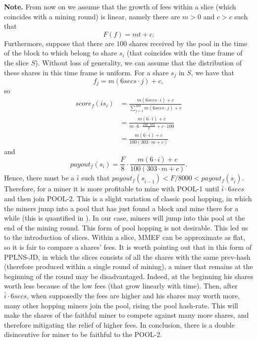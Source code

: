 \documentclass[10pt]{article}
\begin{document}
\textbf{Note.} From now on we assume that the growth of fees within a slice (which coincides with a mining round) is linear, namely there are $m>0$ and $c>c$ such that 
\[F(f) = mt+c.\]
Furthermore, suppose that there are $100$ shares received by the pool in the time of the block to which belong to share $s_i$ (that coincides with the time frame of the slice $S$). Without loss of generality, we can assume that the distribution of these shares in this time frame is uniform. For a share $s_j$ in $S$, we have that 
\[ f_j = m(6secs \cdot j) +c,\]
so
\begin{align*}
	score_f(is_i) &= \frac{m(6secs\cdot i) +c}{\sum_{j=1}^{100} m(6secs\cdot j) +c}\\
	&= \frac{m(6\cdot i) +c}{m\cdot 6\cdot\frac{100\cdot101}{2} +c\cdot 100}\\
	&= \frac{m(6\cdot i) +c}{100(303\cdot m +c)}
\end{align*}
and 
\[payout_f(s_i) = \frac{F}{8} \cdot \frac{m(6\cdot i) +c}{100(303\cdot m +c)}.\]
Hence, there must be a $\bar i$ such that $payout_f(s_{\bar i -1})< F/8000<payout_f(s_{\bar i })$.
Therefore, for a miner it is more profitable to mine with POOL-1 until $\bar i \cdot 6 secs$ and then join POOL-2. This is a slight variation of classic pool hopping, in which the miners jump into a pool that has just found a block and mine there for a while (this is quantified in \cite{rosenfeld}). In our case, miners will jump into this pool at the end of the mining round. This form of pool hopping is not desirable. This led us to the introduction of slices. Within a slice, MMEF can be approximate as flat, so it is fair to compare a shares' fees.
It is worth pointing out that in this form of PPLNS-JD, in which the slices consists of all the shares with the same prev-hash (therefore produced within a single round of mining), a miner that remains at the beginning of the round may be disadvantaged. Indeed, at the beginning his shares worth less because of the low fees (that grow linearly with time). Then, after $\bar i \cdot 6 secs$, when supposedly the fees are higher and his shares may worth more, many other hopping miners join the pool, rising the pool hash-rate. This will make the shares of the faithful miner to compete against many more shares, and therefore mitigating the relief of higher fees. In conclusion, there is a double disincentive for miner to be faithful to the POOL-2.
\end{document}
